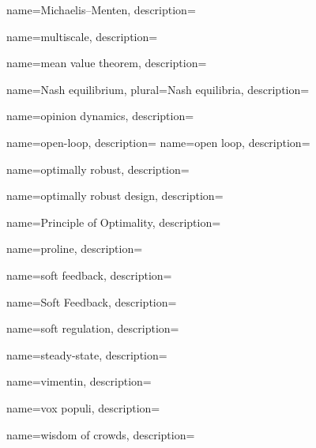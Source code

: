 	{
		name={Michaelis--Menten},
		description={}
	}		


	{
		name={multiscale},
		description={}
	}		


	{
		name={mean value theorem},
		description={}
	}		
	

	{
		name={Nash equilibrium},
		plural={Nash equilibria},
		description={}
	}
	

	{
		name={opinion dynamics},
		description={}
	}

	{
		name={open-loop},
		description={}
	}
	{
		name={open loop},
		description={}
	}	

	{
		name={optimally robust},
		description={}
	}
	
	{
		name={optimally robust design},
		description={}
	}
	

	{
		name={Principle of Optimality},
		description={}
	}

	{
		name={proline},
		description={}
	}


	{
		name={soft feedback},
		description={}
	}

	{
		name={Soft Feedback},
		description={}
	}

	{
		name={soft regulation},
		description={}
	}
	
	{
		name={steady-state},
		description={}
	}	
		

	{
		name={vimentin},
		description={}
	}

	{
		name={vox populi},
		description={}
	}	


	{
		name={wisdom of crowds},
		description={}
	}
	

